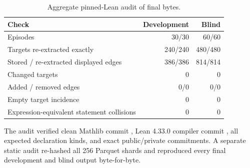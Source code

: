 \begin{table}[ht]
\centering
\caption{Aggregate pinned-Lean audit of final bytes.}
\small
\begin{tabular}{lrr}
\toprule
Check & Development & Blind \\
\midrule
Episodes & 30/30 & 60/60 \\
Targets re-extracted exactly & 240/240 & 480/480 \\
Stored / re-extracted displayed edges & 386/386 & 814/814 \\
Changed targets & 0 & 0 \\
Added / removed edges & 0/0 & 0/0 \\
Empty target incidence & 0 & 0 \\
Expression-equivalent statement collisions & 0 & 0 \\
\bottomrule
\end{tabular}
\end{table}

The audit verified clean Mathlib commit
, Lean 4.33.0 compiler commit
, all expected declaration
kinds, and exact public/private commitments. A separate static audit re-hashed
all 256 Parquet shards and reproduced every final development and blind output
byte-for-byte.
